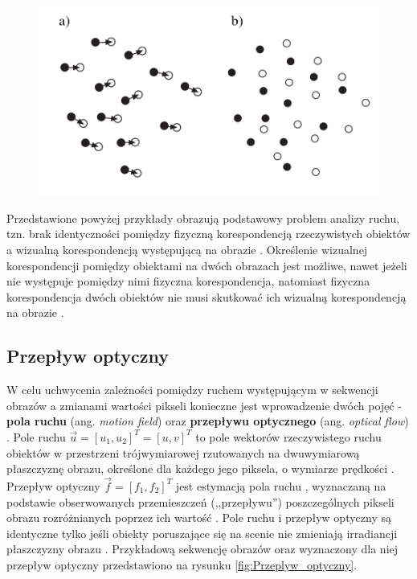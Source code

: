 \begin{figure}[!htb]
	\begin{center}
		\includegraphics[width=12cm]{images/correspondence_problem.png}
	\end{center}	
\label{fig:Problem_korespondencji}
\end{figure}

Przedstawione powyżej przykłady obrazują podstawowy problem analizy ruchu, tzn. brak identyczności pomiędzy fizyczną korespondencją rzeczywistych obiektów a wizualną korespondencją występującą na obrazie \cite{Jaehne2005}. Określenie wizualnej korespondencji pomiędzy obiektami na dwóch obrazach jest możliwe, nawet jeżeli nie występuje pomiędzy nimi fizyczna korespondencja, natomiast fizyczna korespondencja dwóch obiektów nie musi skutkować ich wizualną korespondencją na obrazie \cite{Jaehne2005}.

\subsection{Przepływ optyczny}
\label{subsec:Przeplyw_optyczny}
W celu uchwycenia zależności pomiędzy ruchem występującym w sekwencji obrazów a zmianami wartości pikseli konieczne jest wprowadzenie dwóch pojęć - \textbf{pola ruchu} (ang. \textit{motion field}) oraz \textbf{przepływu optycznego} (ang. \textit{optical flow}) \cite{Jaehne2005}. Pole ruchu $\vec{u} = [u_1, u_2]^T = [u, v]^T$ to pole wektorów rzeczywistego ruchu obiektów w przestrzeni trójwymiarowej rzutowanych na dwuwymiarową płaszczyznę obrazu, określone dla każdego jego piksela, o wymiarze prędkości \cite{Jaehne2005} \cite{Baker2011}. Przepływ optyczny $\vec{f} = [f_1, f_2]^T$ jest estymacją pola ruchu \cite{Szeliski2011}, wyznaczaną na podstawie obserwowanych przemieszczeń (,,przepływu'') poszczególnych pikseli obrazu rozróżnianych poprzez ich wartość \cite{Jaehne2005} \cite{Baker2011} \cite{Horn1981}. Pole ruchu i przepływ optyczny są identyczne tylko jeśli obiekty poruszające się na scenie nie zmieniają irradiancji płaszczyzny obrazu \cite{Jaehne2005}. Przykładową sekwencję obrazów oraz wyznaczony dla niej przepływ optyczny przedstawiono na rysunku \ref{fig:Przeplyw_optyczny}.

